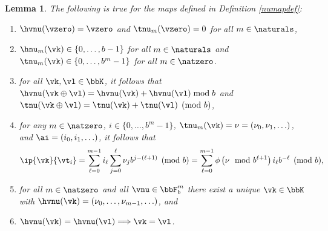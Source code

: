 \documentclass[]{elsarticle}
\newtheorem{lem}{Lemma}
\theoremstyle{definition}
\begin{document}
\begin{lem} \label{numaplem} The following is true for the maps defined in Definition \ref{numapdef}:
\begin{enumerate}
\renewcommand{\labelenumi}{\alph{enumi})}

\item $\hvnu(\vzero)=\vzero$ and $\tnu_m(\vzero) = 0$ for all $m \in \naturals$,

\item $\hnu_m(\vk)\in \{0,\dots,b-1\}$ for all $m\in\naturals$ and $\tnu_m(\vk)\in \{0,\dots,b^m-1\}$ for all $m\in\natzero$.

\item for all $\vk, \vl \in \bbK$, it follows that $\hvnu(\vk \oplus \vl)=\hvnu(\vk) + \hvnu(\vl) \bmod b$ and $\tnu(\vk \oplus \vl)=\tnu(\vk) + \tnu(\vl) \pmod b$,

\item for any $m \in \natzero$, $i \in \{0, \ldots, b^m-1\}$,  $\tnu_m(\vk)=\nu=(\nu_0, \nu_1, \ldots)$, and $\ai=(i_0, i_1, \ldots)$, it follows that
\begin{equation} \label{nuwisum}
\ip{\vk}{\vt_i} = \sum_{\ell=0}^{m-1} i_\ell \sum_{j=0}^{\ell} \nu_jb^{j-(\ell+1)} \pmod b = \sum_{\ell=0}^{m-1} \phi\left(\nu \mod b^{\ell+1}\right) i_{\ell}b^{-\ell} \pmod b,
\end{equation}

\item for all $m\in \natzero$ and all $\vnu \in \bbF_b^{m}$ there exist a unique $\vk \in \bbK$ with $\hvnu(\vk)=(\nu_0, \ldots, \nu_{m-1}, \ldots)$, and

\item $\hvnu(\vk)=\hvnu(\vl) \Longrightarrow \vk = \vl$.

\end{enumerate}
\end{lem}
\end{document}
